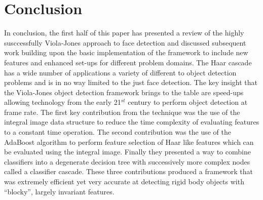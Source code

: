 \documentclass[conference]{IEEEtran}
\begin{document}
%





\section{Conclusion} \label{sec:conclusion}
In conclusion, the first half of this paper has presented a review of the highly susccessfully Viola-Jones approach to face detection and discussed subsequent work building upon the basic implementation of the framework to include new features and enhanced set-ups for different problem domains. The Haar cascade has a wide number of applications a variety of different to object detection problems and is in no way limited to the just face detection. The key insight that the Viola-Jones object detection framework brings to the table are speed-ups allowing technology from the early 21$^{st}$ century to perform object detection at frame rate. The first key contribution from the technique was the use of the integral image data structure to reduce the time complexity of evaluating features to a constant time operation. The second contribution was the use of the AdaBoost algorithm to perform feature selection of Haar like features which can be evaluated using the integral image. Finally they presented a way to combine classifiers into a degenerate decision tree with successively more complex nodes called a classifier cascade. These three contributions produced a framework that was extremely efficient yet very accurate at detecting rigid body objects with ``blocky'', largely invariant features.
\end{document}
